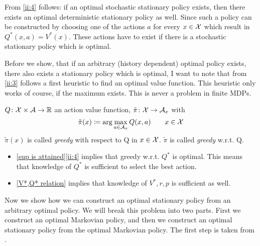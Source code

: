 \begin{remark}\label{opt stat => opt det stat}
	From \ref{ii:4} follows: if an optimal stochastic stationary policy exists, then there exists an optimal deterministic stationary policy as well. Since such a policy can be constructed by choosing one of the actions \(a\) for every \(x\in\mathcal{X}\) which result in \(Q^*(x,a)=V^*(x)\). These actions have to exist if there is a stochastic stationary policy which is optimal.
\end{remark}
	Before we show, that if an arbitrary (history dependent) optimal policy exists, there also exists a stationary policy which is optimal, I want to note that from \ref{ii:3} follows a first heuristic to find an optimal value function. This heuristic only works of course, if the maximum exists. This is never a problem in finite MDPs. 
\begin{definition}
	\(Q\colon\mathcal{X}\times\mathcal{A}\to\mathbb{R}\) an action value function, \(\tilde{\pi}\colon\mathcal{X}\to\mathcal{A}_x\) with
	\[
	\tilde{\pi}(x)\coloneqq\arg\max_{a\in\mathcal{A}_x} Q(x,a)\qquad x\in\mathcal{X}
	\]
	\(\tilde{\pi}(x)\) is called \emph{greedy} with respect to Q in \(x\in\mathcal{X}\).
	\(\tilde{\pi}\) is called \emph{greedy} w.r.t. Q.
\end{definition}

\begin{remark}\leavevmode
	\begin{itemize}
	\item \ref{sup is attained}\ref{ii:4} implies that greedy w.r.t. \(Q^*\) is optimal. 
	This means that knowledge of \(Q^*\) is sufficient to select the best action.
	\item \ref{V*,Q* relation} implies that knowledge of \(V^*,r,p\) is sufficient as well.
	\end{itemize}
\end{remark}

Now we show how we can construct an optimal stationary policy from an arbitrary optimal policy. We will break this problem into two parts. First we construct an optimal Markovian policy, and then we construct an optimal stationary policy from the optimal Markovian policy. The first step is taken from \textcite[134-137]{putermanMarkovDecisionProcesses2005}.

